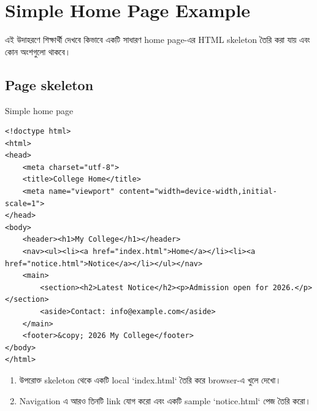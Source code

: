 \section{Simple Home Page Example}

\begin{learningbox}
এই উদাহরণে শিক্ষার্থী দেখবে কিভাবে একটি সাধারণ home page-এর HTML skeleton তৈরি করা যায় এবং কোন অংশগুলো থাকবে।
\end{learningbox}

\subsection{Page skeleton}
\begin{examplebox}{Simple home page}
\begin{verbatim}
<!doctype html>
<html>
<head>
	<meta charset="utf-8">
	<title>College Home</title>
	<meta name="viewport" content="width=device-width,initial-scale=1">
</head>
<body>
	<header><h1>My College</h1></header>
	<nav><ul><li><a href="index.html">Home</a></li><li><a href="notice.html">Notice</a></li></ul></nav>
	<main>
		<section><h2>Latest Notice</h2><p>Admission open for 2026.</p></section>
		<aside>Contact: info@example.com</aside>
	</main>
	<footer>&copy; 2026 My College</footer>
</body>
</html>
\end{verbatim}
\end{examplebox}

\begin{practicebox}
\begin{enumerate}
\item উপরোক্ত skeleton থেকে একটি local `index.html` তৈরি করে browser-এ খুলে দেখো।
\item Navigation এ আরও তিনটি link যোগ করো এবং একটি sample `notice.html` পেজ তৈরি করো।
\end{enumerate}
\end{practicebox}
